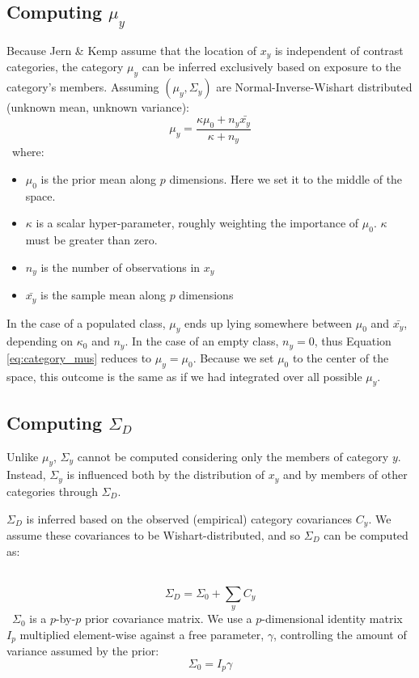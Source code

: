 \documentclass[12pt]{article}
\begin{document}
\subsection*{Computing $\mu_y$}
Because Jern \& Kemp assume that the location of $x_y$ is independent of contrast categories, the category $\mu_{y}$ can be inferred exclusively based on exposure to the category's members. Assuming $(\mu_y, \Sigma_y)$ are Normal-Inverse-Wishart distributed (unknown mean, unknown variance):
\
\begin{equation}
  \mu_y = \dfrac
    {\kappa\mu_{0} + n_y \bar{x_y}}
    {\kappa + n_y}
    \label{eq:category_mus}
\end{equation}
\ 
where:
\begin{itemize}
    \setlength\itemsep{-0.5em}
    \item $\mu_{0}$ is the prior mean along $p$ dimensions. Here we set it to the middle of the space.
    \item $\kappa$ is a scalar hyper-parameter, roughly weighting the importance of $\mu_{0}$. $\kappa$ must be greater than zero.
    \item $n_y$ is the number of observations in $x_y$
    \item $\bar{x_y}$ is the sample mean along $p$ dimensions
\end{itemize}

In the case of a populated class, $\mu_{y}$ ends up lying somewhere between $\mu_{0}$ and $\bar{x_y}$, depending on $\kappa_{0}$ and $n_y$. In the case of an empty class, $n_y = 0$, thus Equation \ref{eq:category_mus} reduces to $\mu_{y} = \mu_{0}$. Because we set $\mu_0$ to the center of the space, this outcome is the same as if we had integrated over all possible $\mu_y$.


\subsection*{Computing $\Sigma_D$}

Unlike $\mu_y$, $\Sigma_y$ cannot be computed considering only the members of category $y$. Instead, $\Sigma_y$ is influenced both by the distribution of $x_y$ and by members of other categories through $\Sigma_D$.

$\Sigma_D$ is inferred based on the observed (empirical) category covariances $C_y$. We assume these covariances to be Wishart-distributed, and so $\Sigma_D$ can be computed as:

\
\begin{equation}
    \Sigma_D = \Sigma_0 + \sum_{y}{C_y}
\end{equation}
\
$\Sigma_{0}$ is a $p$-by-$p$ prior covariance matrix. We use a $p$-dimensional identity matrix $I_p$ multiplied element-wise against a free parameter, $\gamma$, controlling the amount of variance assumed by the prior:
\
\begin{equation}
    \Sigma_0 =  I_p\gamma
\end{equation}
\end{document}
